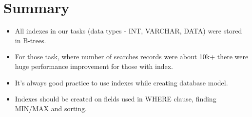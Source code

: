 \documentclass{article}
\begin{document}
\section{Summary}

\begin{itemize}
  \item All indexes in our tasks (data types - INT, VARCHAR, DATA) were stored in B-trees.
  \item For those task, where number of searches records were about 10k+ there were huge performance improvement for those with index.
  \item It's always good practice to use indexes while creating database model.
  \item Indexes should be created on fields used in WHERE clause, finding  MIN/MAX and sorting.
\end{itemize}
\end{document}
